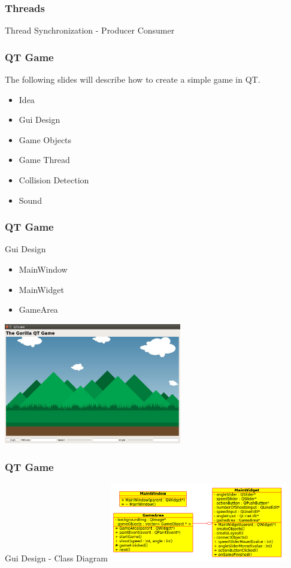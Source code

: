 \begin{frame}[fragile]
\frametitle{Threads}
Thread Synchronization - Producer Consumer\\
{\tiny

}

\end{frame}

\begin{frame}[fragile]
\frametitle{QT Game}
The following slides will describe how to create a simple game in QT.
\begin{itemize}
\item Idea
\item Gui Design
\item Game Objects
\item Game Thread
\item Collision Detection
\item Sound
\end{itemize}
\end{frame}

\begin{frame}[fragile]
\frametitle{QT Game}
Gui Design
\begin{itemize}
\item MainWindow
\item MainWidget
\item GameArea
\end{itemize}
\includegraphics[width=220pt]{img/qtgamegui.png}
\end{frame}

\begin{frame}[fragile]
\frametitle{QT Game}
Gui Design - Class Diagram
\includegraphics[width=220pt]{img/qtgame_cdgui.png}
\end{frame}


